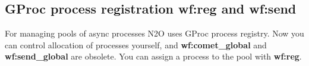 \documentclass[11pt]{article}
\begin{document}
\subsection*{GProc process registration {\bf wf:reg} and {\bf wf:send}}
For managing pools of async processes N2O uses GProc process registry.
Now you can control allocation of processes yourself,
and {\bf wf:comet\_global} and {\bf wf:send_global} are obsolete.
You can assign a process to the pool with {\bf wf:reg}.







\end{document}
